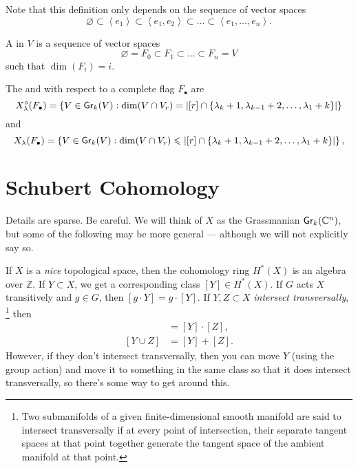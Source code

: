 Note that this definition only depends on the sequence of vector spaces
\begin{equation}
    \varnothing \subset \left\langle e_1 \right\rangle \subset \left\langle e_1, e_2 \right\rangle \subset \ldots \subset \left\langle e_1, \ldots, e_n \right\rangle.
\end{equation}

\begin{definition}
    A  in \(V\) is a sequence of vector spaces
    \begin{equation}
        \varnothing = F_0 \subset F_1 \subset \ldots \subset F_n = V
    \end{equation}
    such that \(\dim(F_i) = i\).
    \end{definition}

The  and  with respect to a complete flag \(F_{\bullet}\) are 
\begin{equation}
    X^{\circ}_{\lambda}(F_{\bullet}) =
    \left\{ V \in \operatorname{\mathsf{Gr}}_k(V) : \dim(V \cap V_r) = \left|[r] \cap \{ \lambda_k + 1, \lambda_{k-1} + 2, \ldots, \lambda_1 + k \} \right| \right\}
\end{equation}
and
\begin{equation}
    X_{\lambda}(F_{\bullet}) =
    \left\{ V \in \operatorname{\mathsf{Gr}}_k(V) : \dim(V \cap V_r) \leqslant \left|[r] \cap \{ \lambda_k + 1, \lambda_{k-1} + 2, \ldots, \lambda_1 + k \} \right| \right\},
\end{equation}

\section{Schubert Cohomology}

Details are sparse.
Be careful.
We will think of \(X\) as the Grassmanian \(\operatorname{\mathsf{Gr}}_k(\mathbb{C}^n)\),
but some of the following may be more general --- although we will not explicitly say so.

If \(X\) is a \emph{nice} topological space,
then the cohomology ring \(H^*(X)\) is an algebra over \(\mathbb{Z}\).
If \(Y \subset X\),
we get a corresponding class \([Y] \in H^*(X)\).
If \(G\) acts \(X\) transitively and \(g \in G\),
then \([g \cdot Y] = g \cdot [Y]\).
If \(Y, Z \subset X\) \emph{intersect transversally},%
\footnote{Two submanifolds of a given finite-dimensional smooth manifold are said to intersect transversally if at every point of intersection, their separate tangent spaces at that point together generate the tangent space of the ambient manifold at that point.}
then
\begin{align}
    [Y \cap Z] &= [Y] \cdot [Z], \\
    [Y \cup Z] &= [Y] + [Z].
\end{align}
However, if they don't intersect transversally, then you can move \(Y\) (using the group action) and move it to something in the same class so that it does intersect transversally, so there's some way to get around this.


